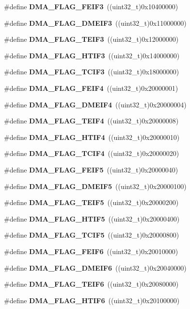 \begin{DoxyCompactItemize}
\item 
\#define \textbf{ D\+M\+A\+\_\+\+F\+L\+A\+G\+\_\+\+F\+E\+I\+F3}~((uint32\+\_\+t)0x10400000)
\item 
\#define \textbf{ D\+M\+A\+\_\+\+F\+L\+A\+G\+\_\+\+D\+M\+E\+I\+F3}~((uint32\+\_\+t)0x11000000)
\item 
\#define \textbf{ D\+M\+A\+\_\+\+F\+L\+A\+G\+\_\+\+T\+E\+I\+F3}~((uint32\+\_\+t)0x12000000)
\item 
\#define \textbf{ D\+M\+A\+\_\+\+F\+L\+A\+G\+\_\+\+H\+T\+I\+F3}~((uint32\+\_\+t)0x14000000)
\item 
\#define \textbf{ D\+M\+A\+\_\+\+F\+L\+A\+G\+\_\+\+T\+C\+I\+F3}~((uint32\+\_\+t)0x18000000)
\item 
\#define \textbf{ D\+M\+A\+\_\+\+F\+L\+A\+G\+\_\+\+F\+E\+I\+F4}~((uint32\+\_\+t)0x20000001)
\item 
\#define \textbf{ D\+M\+A\+\_\+\+F\+L\+A\+G\+\_\+\+D\+M\+E\+I\+F4}~((uint32\+\_\+t)0x20000004)
\item 
\#define \textbf{ D\+M\+A\+\_\+\+F\+L\+A\+G\+\_\+\+T\+E\+I\+F4}~((uint32\+\_\+t)0x20000008)
\item 
\#define \textbf{ D\+M\+A\+\_\+\+F\+L\+A\+G\+\_\+\+H\+T\+I\+F4}~((uint32\+\_\+t)0x20000010)
\item 
\#define \textbf{ D\+M\+A\+\_\+\+F\+L\+A\+G\+\_\+\+T\+C\+I\+F4}~((uint32\+\_\+t)0x20000020)
\item 
\#define \textbf{ D\+M\+A\+\_\+\+F\+L\+A\+G\+\_\+\+F\+E\+I\+F5}~((uint32\+\_\+t)0x20000040)
\item 
\#define \textbf{ D\+M\+A\+\_\+\+F\+L\+A\+G\+\_\+\+D\+M\+E\+I\+F5}~((uint32\+\_\+t)0x20000100)
\item 
\#define \textbf{ D\+M\+A\+\_\+\+F\+L\+A\+G\+\_\+\+T\+E\+I\+F5}~((uint32\+\_\+t)0x20000200)
\item 
\#define \textbf{ D\+M\+A\+\_\+\+F\+L\+A\+G\+\_\+\+H\+T\+I\+F5}~((uint32\+\_\+t)0x20000400)
\item 
\#define \textbf{ D\+M\+A\+\_\+\+F\+L\+A\+G\+\_\+\+T\+C\+I\+F5}~((uint32\+\_\+t)0x20000800)
\item 
\#define \textbf{ D\+M\+A\+\_\+\+F\+L\+A\+G\+\_\+\+F\+E\+I\+F6}~((uint32\+\_\+t)0x20010000)
\item 
\#define \textbf{ D\+M\+A\+\_\+\+F\+L\+A\+G\+\_\+\+D\+M\+E\+I\+F6}~((uint32\+\_\+t)0x20040000)
\item 
\#define \textbf{ D\+M\+A\+\_\+\+F\+L\+A\+G\+\_\+\+T\+E\+I\+F6}~((uint32\+\_\+t)0x20080000)
\item 
\#define \textbf{ D\+M\+A\+\_\+\+F\+L\+A\+G\+\_\+\+H\+T\+I\+F6}~((uint32\+\_\+t)0x20100000)

\end{DoxyCompactItemize}
